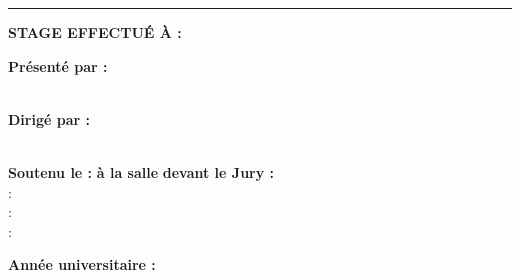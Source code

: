 \begin{titlepage}
\vspace{0.15cm}
\noindent\color{orange}\rule{\textwidth}{1.2pt}\color{black}

\vspace{0.8cm}

\begin{center}
{\fontsize{11}{13}\selectfont \textbf{STAGE EFFECTUÉ À :} \Entreprise\par}
\end{center}

\vspace{0.8cm}

\begin{center}
{\fontsize{11}{13}\selectfont \textbf{\Sigle}\par}
\end{center}

\vspace{0.8cm}

\noindent
\begin{minipage}[t]{0.48\textwidth}
\textbf{Présenté par :}\\[0.4cm]
\EtudiantA\\
\end{minipage}
\hfill
\begin{minipage}[t]{0.48\textwidth}
\textbf{Dirigé par :}\\[0.4cm]
\EncadrantA\\
\EncadrantB
\end{minipage}

\vspace{1.0cm}

\noindent
\textbf{Soutenu le :} \dotfill \quad \textbf{à la salle} \dotfill \quad \textbf{devant le Jury :}\\[0.3cm]
\noindent : \dotfill\\
\noindent : \dotfill\\
\noindent : \dotfill\\

\vfill

\begin{center}
{\fontsize{12}{14}\selectfont \textbf{Année universitaire : \AnneeUniv}\par}
\end{center}

\end{titlepage}